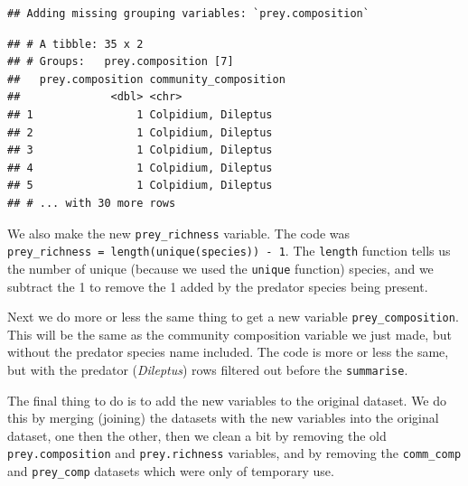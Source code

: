 \documentclass[]{book}
\newenvironment{Shaded}{\begin{snugshade}}{\end{snugshade}}
\newcommand{\DataTypeTok}[1]{\textcolor[rgb]{0.13,0.29,0.53}{#1}}
\newcommand{\KeywordTok}[1]{\textcolor[rgb]{0.13,0.29,0.53}{\textbf{#1}}}
\newcommand{\NormalTok}[1]{#1}
\newcommand{\OperatorTok}[1]{\textcolor[rgb]{0.81,0.36,0.00}{\textbf{#1}}}
\newcommand{\StringTok}[1]{\textcolor[rgb]{0.31,0.60,0.02}{#1}}
\begin{document}
\begin{verbatim}
## Adding missing grouping variables: `prey.composition`
\end{verbatim}

\begin{verbatim}
## # A tibble: 35 x 2
## # Groups:   prey.composition [7]
##   prey.composition community_composition
##              <dbl> <chr>                
## 1                1 Colpidium, Dileptus  
## 2                1 Colpidium, Dileptus  
## 3                1 Colpidium, Dileptus  
## 4                1 Colpidium, Dileptus  
## 5                1 Colpidium, Dileptus  
## # ... with 30 more rows
\end{verbatim}

We also make the new \texttt{prey\_richness} variable. The code was \texttt{prey\_richness\ =\ length(unique(species))\ -\ 1}. The \texttt{length} function tells us the number of unique (because we used the \texttt{unique} function) species, and we subtract the 1 to remove the 1 added by the predator species being present.

Next we do more or less the same thing to get a new variable \texttt{prey\_composition}. This will be the same as the community composition variable we just made, but without the predator species name included. The code is more or less the same, but with the predator (\emph{Dileptus}) rows filtered out before the \texttt{summarise}.

\begin{Shaded}
\end{Shaded}

The final thing to do is to add the new variables to the original dataset. We do this by merging (joining) the datasets with the new variables into the original dataset, one then the other, then we clean a bit by removing the old \texttt{prey.composition} and \texttt{prey.richness} variables, and by removing the \texttt{comm\_comp} and \texttt{prey\_comp} datasets which were only of temporary use.
\end{document}
